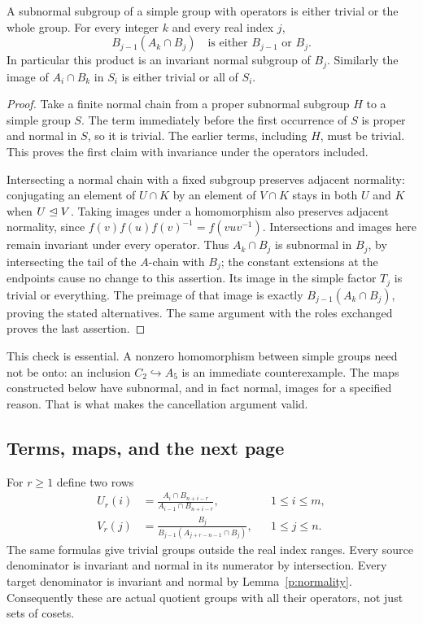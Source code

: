 \begin{lemma}\label{p:normality}
A subnormal subgroup of a simple group with operators is either trivial
or the whole group. For every integer $k$ and every real index $j$,
\[
 B_{j-1}(A_k\cap B_j)
 \quad\text{is either }B_{j-1}\text{ or }B_j.
\]
In particular this product is an invariant normal subgroup of $B_j$.
Similarly the image of $A_i\cap B_k$ in $S_i$ is either trivial or all
of $S_i$.
\end{lemma}
\begin{proof}
Take a finite normal chain from a proper subnormal subgroup $H$ to a
simple group $S$. The term immediately before the first occurrence of
$S$ is proper and normal in $S$, so it is trivial. The earlier terms,
including $H$, must be trivial. This proves the first claim with
invariance under the operators included.

Intersecting a normal chain with a fixed subgroup preserves adjacent
normality: conjugating an element of $U\cap K$ by an element of
$V\cap K$ stays in both $U$ and $K$ when $U\trianglelefteq V$.
Taking images under a homomorphism also preserves adjacent normality,
since $f(v)f(u)f(v)^{-1}=f(vuv^{-1})$. Intersections and images here
remain invariant under every operator. Thus $A_k\cap B_j$ is subnormal
in $B_j$, by intersecting the tail of the $A$-chain with $B_j$; the
constant extensions at the endpoints cause no change to this assertion.
Its image in the simple factor $T_j$ is trivial or everything. The
preimage of that image is exactly $B_{j-1}(A_k\cap B_j)$, proving
the stated alternatives. The same argument with the roles exchanged
proves the last assertion.
\end{proof}

This check is essential. A nonzero homomorphism between simple groups
need not be onto: an inclusion $C_2\hookrightarrow A_5$ is an immediate
counterexample. The maps constructed below have subnormal, and in fact
normal, images for a specified reason. That is what makes the cancellation
argument valid.

\subsection{Terms, maps, and the next page}

For $r\geq1$ define two rows
\begin{align}
 U_r(i)&=
 \frac{A_i\cap B_{n+i-r}}{A_{i-1}\cap B_{n+i-r}},
       &&1\leq i\leq m,\label{p:source}\\
 V_r(j)&=
 \frac{B_j}{B_{j-1}(A_{j+r-n-1}\cap B_j)},
       &&1\leq j\leq n.\label{p:target}
\end{align}
The same formulas give trivial groups outside the real index ranges.
Every source denominator is invariant and normal in its numerator by
intersection. Every target denominator is invariant and normal by
Lemma~\ref{p:normality}. Consequently these are actual quotient groups
with all their operators, not just sets of cosets.

